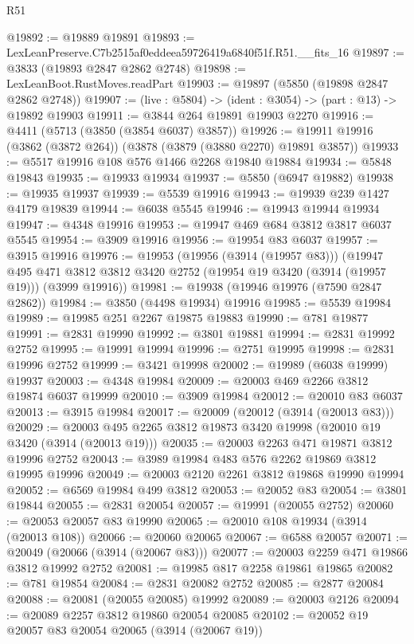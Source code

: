 \begin{lexlean}{R51}
\begin{coremodule}
@19892 := @19889 @19891
@19893 := LexLeanPreserve.C7b2515af0eddeea59726419a6840f51f.R51.__fits_16
@19897 := @3833 (@19893 @2847 @2862 @2748)
@19898 := LexLeanBoot.RustMoves.readPart
@19903 := @19897 (@5850 (@19898 @2847 @2862 @2748))
@19907 := (live : @5804) -> (ident : @3054) -> (part : @13) -> @19892 @19903
@19911 := @3844 @264 @19891 @19903 @2270
@19916 := @4411 (@5713 (@3850 (@3854 @6037) @3857))
@19926 := @19911 @19916 (@3862 (@3872 @264)) (@3878 (@3879 (@3880 @2270) @19891 @3857))
@19933 := @5517 @19916 @108 @576 @1466 @2268 @19840 @19884
@19934 := @5848 @19843
@19935 := @19933 @19934
@19937 := @5850 (@6947 @19882)
@19938 := @19935 @19937
@19939 := @5539 @19916
@19943 := @19939 @239 @1427 @4179 @19839
@19944 := @6038 @5545
@19946 := @19943 @19944 @19934
@19947 := @4348 @19916
@19953 := @19947 @469 @684 @3812 @3817 @6037 @5545
@19954 := @3909 @19916
@19956 := @19954 @83 @6037
@19957 := @3915 @19916
@19976 := @19953
    (@19956 (@3914 (@19957 @83)))
    (@19947
      @495
      @471
      @3812
      @3812
      @3420
      @2752
      (@19954 @19 @3420 (@3914 (@19957 @19)))
      (@3999 @19916))
@19981 := @19938 (@19946 @19976 (@7590 @2847 @2862))
@19984 := @3850 (@4498 @19934) @19916
@19985 := @5539 @19984
@19989 := @19985 @251 @2267 @19875 @19883
@19990 := @781 @19877
@19991 := @2831 @19990
@19992 := @3801 @19881
@19994 := @2831 @19992 @2752
@19995 := @19991 @19994
@19996 := @2751 @19995
@19998 := @2831 @19996 @2752
@19999 := @3421 @19998
@20002 := @19989 (@6038 @19999) @19937
@20003 := @4348 @19984
@20009 := @20003 @469 @2266 @3812 @19874 @6037 @19999
@20010 := @3909 @19984
@20012 := @20010 @83 @6037
@20013 := @3915 @19984
@20017 := @20009 (@20012 (@3914 (@20013 @83)))
@20029 := @20003 @495 @2265 @3812 @19873 @3420 @19998 (@20010 @19 @3420 (@3914 (@20013 @19)))
@20035 := @20003 @2263 @471 @19871 @3812 @19996 @2752
@20043 := @3989 @19984 @483 @576 @2262 @19869 @3812 @19995 @19996
@20049 := @20003 @2120 @2261 @3812 @19868 @19990 @19994
@20052 := @6569 @19984 @499 @3812
@20053 := @20052 @83
@20054 := @3801 @19844
@20055 := @2831 @20054
@20057 := @19991 (@20055 @2752)
@20060 := @20053 @20057 @83 @19990
@20065 := @20010 @108 @19934 (@3914 (@20013 @108))
@20066 := @20060 @20065
@20067 := @6588 @20057
@20071 := @20049 (@20066 (@3914 (@20067 @83)))
@20077 := @20003 @2259 @471 @19866 @3812 @19992 @2752
@20081 := @19985 @817 @2258 @19861 @19865
@20082 := @781 @19854
@20084 := @2831 @20082 @2752
@20085 := @2877 @20084
@20088 := @20081 (@20055 @20085) @19992
@20089 := @20003 @2126
@20094 := @20089 @2257 @3812 @19860 @20054 @20085
@20102 := @20052 @19 @20057 @83 @20054 @20065 (@3914 (@20067 @19))

\end{coremodule}
\end{lexlean}
